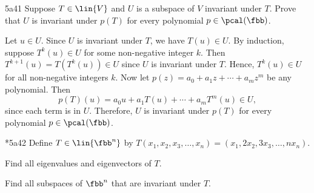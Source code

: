 \begin{exercise}{5a41}
    Suppose $T \in \lin{V}$ and $U$ is a subspace of $V$ invariant under $T$.
	Prove that $U$ is invariant under $p(T)$ for every polynomial $p \in \pcal(\fbb)$.
\end{exercise}

\begin{sol}
    Let $u \in U$.
	Since $U$ is invariant under $T$, we have $T(u) \in U$.
	By induction, suppose $T^k(u) \in U$ for some non-negative integer $k$.
	Then $T^{k+1}(u) = T(T^k(u)) \in U$ since $U$ is invariant under $T$.
	Hence, $T^k(u) \in U$ for all non-negative integers $k$.
	Now let $p(z) = a_0 + a_1 z + \cdots + a_m z^m$ be any polynomial.
	Then
    \[
    	p(T)(u) = a_0 u + a_1 T(u) + \cdots + a_m T^m(u) \in U,
    \]
    since each term is in $U$.
	Therefore, $U$ is invariant under $p(T)$ for every polynomial $p \in \pcal(\fbb)$.
\end{sol}

\begin{exercise}*{5a42}
    Define $T \in \lin{\fbb^n}$ by $T(x_1, x_2, x_3, \ldots, x_n) = (x_1, 2x_2, 3x_3, \ldots, nx_n)$.
    \begin{subexercises}
        \item Find all eigenvalues and eigenvectors of $T$.
        \item Find all subspaces of $\fbb^n$ that are invariant under $T$.
    \end{subexercises}
\end{exercise}

